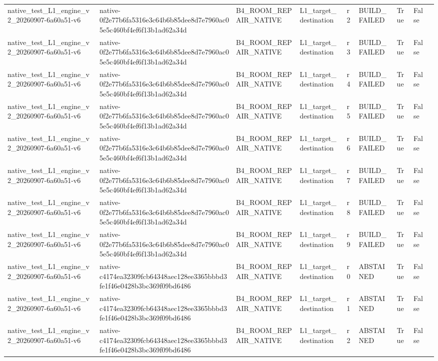 \begin{tabular}{lllllllll}
native\_test\_L1\_engine\_v2\_20260907-6a60a51-v6 & native-0f2e77b6fa5316e3c64b6b85dee8d7e7960ac05e5c460bf4ef6f13b1ad62a34d & B4\_ROOM\_REPAIR\_NATIVE & L1\_target\_destination & r2 & BUILD\_FAILED & True & False &  \\
native\_test\_L1\_engine\_v2\_20260907-6a60a51-v6 & native-0f2e77b6fa5316e3c64b6b85dee8d7e7960ac05e5c460bf4ef6f13b1ad62a34d & B4\_ROOM\_REPAIR\_NATIVE & L1\_target\_destination & r3 & BUILD\_FAILED & True & False &  \\
native\_test\_L1\_engine\_v2\_20260907-6a60a51-v6 & native-0f2e77b6fa5316e3c64b6b85dee8d7e7960ac05e5c460bf4ef6f13b1ad62a34d & B4\_ROOM\_REPAIR\_NATIVE & L1\_target\_destination & r4 & BUILD\_FAILED & True & False &  \\
native\_test\_L1\_engine\_v2\_20260907-6a60a51-v6 & native-0f2e77b6fa5316e3c64b6b85dee8d7e7960ac05e5c460bf4ef6f13b1ad62a34d & B4\_ROOM\_REPAIR\_NATIVE & L1\_target\_destination & r5 & BUILD\_FAILED & True & False &  \\
native\_test\_L1\_engine\_v2\_20260907-6a60a51-v6 & native-0f2e77b6fa5316e3c64b6b85dee8d7e7960ac05e5c460bf4ef6f13b1ad62a34d & B4\_ROOM\_REPAIR\_NATIVE & L1\_target\_destination & r6 & BUILD\_FAILED & True & False &  \\
native\_test\_L1\_engine\_v2\_20260907-6a60a51-v6 & native-0f2e77b6fa5316e3c64b6b85dee8d7e7960ac05e5c460bf4ef6f13b1ad62a34d & B4\_ROOM\_REPAIR\_NATIVE & L1\_target\_destination & r7 & BUILD\_FAILED & True & False &  \\
native\_test\_L1\_engine\_v2\_20260907-6a60a51-v6 & native-0f2e77b6fa5316e3c64b6b85dee8d7e7960ac05e5c460bf4ef6f13b1ad62a34d & B4\_ROOM\_REPAIR\_NATIVE & L1\_target\_destination & r8 & BUILD\_FAILED & True & False &  \\
native\_test\_L1\_engine\_v2\_20260907-6a60a51-v6 & native-0f2e77b6fa5316e3c64b6b85dee8d7e7960ac05e5c460bf4ef6f13b1ad62a34d & B4\_ROOM\_REPAIR\_NATIVE & L1\_target\_destination & r9 & BUILD\_FAILED & True & False &  \\
native\_test\_L1\_engine\_v2\_20260907-6a60a51-v6 & native-c4174ea32309fcb64348aec128ee3365bbbd3fe1f46e0428b3bc369f09bd6486 & B4\_ROOM\_REPAIR\_NATIVE & L1\_target\_destination & r0 & ABSTAINED & True & False &  \\
native\_test\_L1\_engine\_v2\_20260907-6a60a51-v6 & native-c4174ea32309fcb64348aec128ee3365bbbd3fe1f46e0428b3bc369f09bd6486 & B4\_ROOM\_REPAIR\_NATIVE & L1\_target\_destination & r1 & ABSTAINED & True & False &  \\
native\_test\_L1\_engine\_v2\_20260907-6a60a51-v6 & native-c4174ea32309fcb64348aec128ee3365bbbd3fe1f46e0428b3bc369f09bd6486 & B4\_ROOM\_REPAIR\_NATIVE & L1\_target\_destination & r2 & ABSTAINED & True & False &  \\

\end{tabular}
